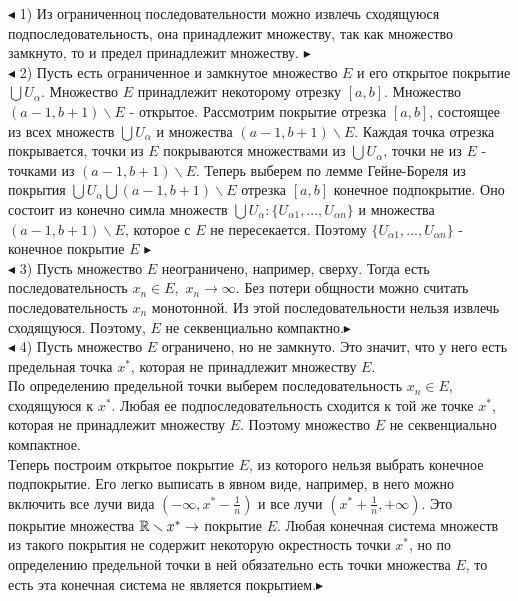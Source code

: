 $\blacktriangleleft$ 1) Из ограниченноц последовательности можно извлечь сходящуюся подпоследовательность, она принадлежит множеству, так как множество замкнуто, то и предел принадлежит множеству. $\blacktriangleright$\\
$\blacktriangleleft$ 2) Пусть есть ограниченное и замкнутое множество $E$ и его открытое покрытие  $\bigcup U_{\alpha}$. Множество $E$ принадлежит некоторому отрезку $[a,b]$. Множество $(a-1, b+1)\smallsetminus E$ - открытое. Рассмотрим покрытие отрезка $[a,b]$, состоящее из всех множеств $\bigcup U_{\alpha}$ и множества $(a-1,b+1)\smallsetminus E$. Каждая точка отрезка покрывается, точки из $E$ покрываются множествами из $\bigcup U_{\alpha}$, точки не из $E$ - точками из $(a-1,b+1)\smallsetminus E$. Теперь выберем по лемме Гейне-Бореля из покрытия $\bigcup U_{\alpha}\bigcup(a-1,b+1)\smallsetminus E$ отрезка $[a,b]$ конечное подпокрытие. Оно состоит из конечно симла множеств $\bigcup U_{\alpha}\colon \{U_{\alpha 1},...,U_{\alpha n}\} $  и множества $(a-1,b+1)\smallsetminus E$, которое с $E$ не пересекается. Поэтому $\{U_{\alpha 1},...,U_{\alpha n}\}$ - конечное покрытие $E$ $ \blacktriangleright$\\
$\blacktriangleleft$ 3) Пусть множество $E$ неограничено, например, сверху. Тогда есть последовательность $x_n \in E$,\ $x_n \rightarrow \infty$. Без потери общности можно считать последовательность $x_n$ монотонной. Из этой последовательности нельзя извлечь сходящуюся. Поэтому, $E$ не секвенциально компактно.$\blacktriangleright$\\
$\blacktriangleleft$ 4) Пусть множество $E$ ограничено, но не замкнуто. Это значит, что у него есть предельная точка $x^*$, которая не принадлежит множеству $E$.\\
По определению предельной точки выберем последовательность $x_n \in E$, сходящуюся к $x^*$. Любая ее подпоследовательность сходится к той же точке $x^*$, которая не принадлежит множеству $E$. Поэтому множество $E$ не секвенциально компактное.\\
Теперь построим открытое покрытие $E$, из которого нельзя выбрать конечное подпокрытие. Его легко выписать в явном виде, например, в него можно включить все лучи вида $(-\infty, x^*-\frac{1}{n})$ и все лучи $(x^*+\frac{1}{n}, +\infty)$. Это покрытие множества $\mathbb{R} \smallsetminus {x^*} \rightarrow$ покрытие $E$. Любая конечная система множеств из такого покрытия не содержит некоторую окрестность точки $x^*$, но по определению предельной точки в ней обязательно есть точки множества $E$, то есть эта конечная система не является покрытием.$\blacktriangleright$\\



